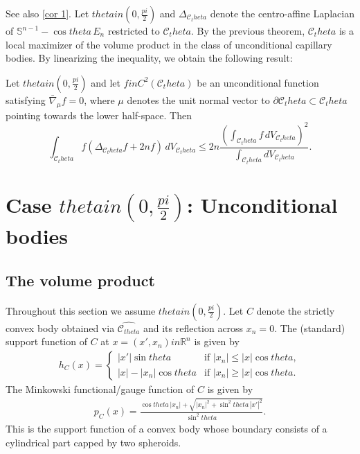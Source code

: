 \documentclass[12pt]{amsart}
\def\theta{theta}%
\def\pi{pi}%
\def\in{in }%
\numberwithin{equation}{section}
\newcommand{\wh}{\widehat}
\newcommand{\bbR}{\mathbb{R}}
\newcommand{\8}{\infty}
\renewcommand{\(}{\left(}
\renewcommand{\)}{\right)}
\newcommand{\eq}[1]{\begin{equation}\begin{alignedat}{2} #1 \end{alignedat}\end{equation}}
\begin{document}
See also \autoref{cor 1}. Let $\theta \in \left(0, \frac{\pi}{2}\right)$ and $\Delta_{\mathcal{C}_\theta}$ denote the centro-affine Laplacian of $\mathbb{S}^{n-1} - \cos\theta \,E_n$ restricted to $\mathcal{C}_\theta$. By the previous theorem, $\mathcal{C}_\theta$ is a local maximizer of the volume product in the class of unconditional capillary bodies. By linearizing the inequality, we obtain the following result:


\begin{thm}\label{thm 2}
Let $\theta \in \left(0, \frac{\pi}{2}\right)$ and let $f \in C^2(\mathcal{C}_\theta)$ be an unconditional function satisfying $\bar{\nabla}_\mu f = 0$, where $\mu$ denotes the unit normal vector to $\partial \mathcal{C}_\theta \subset \mathcal{C}_\theta$ pointing towards the lower half-space. Then
\begin{equation}
\int_{\mathcal{C}_\theta} f \left( \Delta_{\mathcal{C}_\theta} f + 2n f \right) \, dV_{\mathcal{C}_\theta} \leq 2n \frac{\left( \int_{\mathcal{C}_\theta} f \, dV_{\mathcal{C}_\theta} \right)^2}{\int_{\mathcal{C}_\theta} dV_{\mathcal{C}_\theta}}.
\end{equation}
\end{thm}

\section{\texorpdfstring{Case $\theta\in (0,\frac{\pi}{2})$: Unconditional bodies}{Case theta in (0, pi/2}}
\subsection{The volume product}
Throughout this section we assume $\theta\in (0,\frac{\pi}{2})$. Let $C$ denote the strictly convex body obtained via $\wh{\mathcal{C}_{\theta}}$ and its reflection across $x_n=0$. The (standard) support function of $C$ at $x=(x',x_n)\in \bbR^n$ is given by
\eq{
h_C(x) =
\begin{cases}
|x'| \sin \theta & \text{if } |x_n| \leq |x| \cos \theta ,\\
|x| - |x_n| \cos \theta & \text{if } |x_n| \geq |x| \cos\theta.
\end{cases}
}
The Minkowski functional/gauge function of $C$ is given by
\eq{\label{def: C-Minkowski functional}
p_C(x)=\frac{\cos \theta \,|x_n|+\sqrt{|x_n|^2+\sin^2 \theta \,|x'|^2}}{\sin^2 \theta}.
}
This is the support function of a convex body whose boundary consists of a cylindrical part capped by two spheroids.
\end{document}
